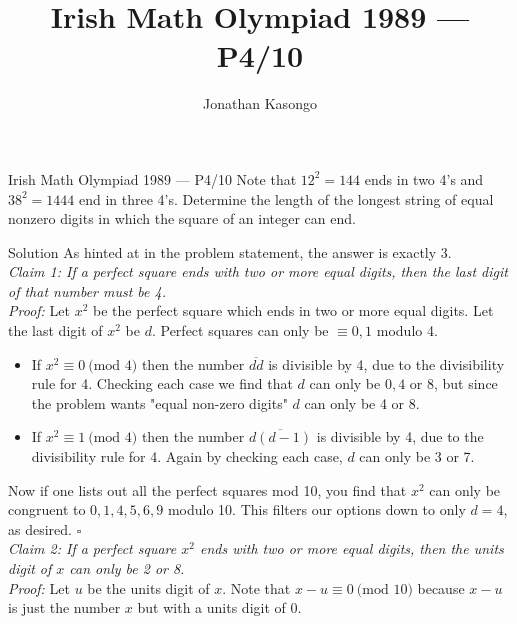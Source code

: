 \documentclass{article}
\title{Irish Math Olympiad 1989 --- P4/10}
\author{Jonathan Kasongo}
\begin{document}
\maketitle

\begin{problem}{Irish Math Olympiad 1989 --- P4/10}
Note that $12^2 = 144$ ends in two 4’s and $38^2 = 1444$ end in three 4’s.
Determine the length of the longest string of equal nonzero digits in which
the square of an integer can end.
\end{problem}

\begin{solution}{Solution}
As hinted at in the problem statement, the answer is exactly 3.\\

\textit{Claim 1: If a perfect square ends with two or more equal digits,
then the last digit of that number must be 4.}\\

\textit{Proof: } Let $x^2$ be the perfect square which ends in two or more
equal digits. Let the last digit of $x^2$ be $d$.
Perfect squares can only be $\equiv 0, 1$ modulo 4.

\begin{itemize}
\item If $x^2 \equiv 0 \ \text{(mod } 4)$ then the number $\overline{dd}$ is
divisible by 4, due to the divisibility rule for 4. Checking each case we
find that $d$ can only be $0, 4$ or 8, but since the problem
wants "equal non-zero digits" $d$ can only be 4 or 8.
\item If $x^2 \equiv 1 \ \text{(mod } 4)$ then the number
$\overline{d(d-1)}$ is divisible by 4, due to the divisibility rule for 4.
Again by checking each case, $d$ can only be 3 or 7.
\end{itemize}

Now if one lists out all the perfect squares mod 10, you find that
$x^2$ can only be congruent to $0,1,4,5,6,9$ modulo 10. This filters our
options down to only $d = 4$, as desired. $\square$\\

\textit{Claim 2: If a perfect square $x^2$
ends with two or more equal digits, then the units digit of $x$ can only be
2 or 8.}\\

\textit{Proof: } Let $u$ be the units digit of $x$.
Note that $x-u \equiv 0 \ \text{(mod } 10)$ because $x-u$ is just the
number $x$ but with a units digit of 0.

\vspace{0.2cm}


\end{solution}
\end{document}
